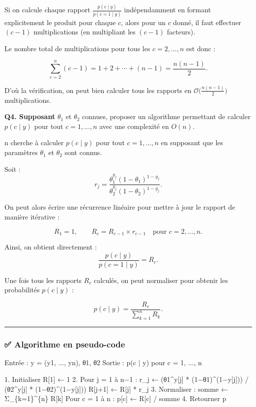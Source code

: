 \documentclass[
]{article}
\newenvironment{Shaded}{\begin{snugshade}}{\end{snugshade}}
\newcommand{\NormalTok}[1]{#1}
\begin{document}
Si on calcule chaque rapport \(\frac{p(c \mid y)}{p(c = 1 \mid y)}\)
indépendamment en formant explicitement le produit pour chaque \(c\),
alors pour un \(c\) donné, il faut effectuer \((c - 1)\) multiplications
(en multipliant les \((c - 1)\) facteurs).

Le nombre total de multiplications pour tous les \(c = 2, \ldots, n\)
est donc :

\[
\sum_{c=2}^{n} (c - 1)
= 1 + 2 + \cdots + (n - 1)
= \frac{n(n - 1)}{2}.
\]

D'où la vérification, on peut bien calculer tous les rapports en
\(\mathcal{O}\big(\tfrac{n(n - 1)}{2}\big)\) multiplications.

\textbf{Q4. Supposant} \(\theta_1\) et \(\theta_2\) connues, proposer un
algorithme permettant de calculer \(p(c \mid y)\) pour tout
\(c = 1, \ldots, n\) avec une complexité en \(O(n)\).

n cherche à calculer \(p(c \mid y)\) pour tout \(c = 1, \ldots, n\) en
supposant que les paramètres \(\theta_1\) et \(\theta_2\) sont connus.

Soit : \[
r_j = 
\frac{\theta_1^{y_j}(1 - \theta_1)^{1 - y_j}}
{\theta_2^{y_j}(1 - \theta_2)^{1 - y_j}}.
\]

On peut alors écrire une récurrence linéaire pour mettre à jour le
rapport de manière itérative :

\[
R_1 = 1, \qquad
R_c = R_{c-1} \times r_{c-1} \quad \text{pour } c = 2, \ldots, n.
\]

Ainsi, on obtient directement : \[
\frac{p(c \mid y)}{p(c = 1 \mid y)} = R_c.
\]

Une fois tous les rapports \(R_c\) calculés, on peut normaliser pour
obtenir les probabilités \(p(c \mid y)\) :

\[
p(c \mid y) = \frac{R_c}{\sum_{k=1}^{n} R_k}.
\]

\begin{center}\rule{0.5\linewidth}{0.5pt}\end{center}

\subsubsection{✅ Algorithme en
pseudo-code}\label{algorithme-en-pseudo-code}

\begin{Shaded}
\begin{Highlighting}[]
\NormalTok{Entrée : y = (y1, ..., yn), θ1, θ2}
\NormalTok{Sortie : p(c | y) pour c = 1, ..., n}

\NormalTok{1. Initialiser R[1] ← 1}
\NormalTok{2. Pour j = 1 à n−1 :}
\NormalTok{       r\_j ← (θ1\^{}y[j] * (1−θ1)\^{}(1−y[j])) / (θ2\^{}y[j] * (1−θ2)\^{}(1−y[j]))}
\NormalTok{       R[j+1] ← R[j] * r\_j}
\NormalTok{3. Normaliser :}
\NormalTok{       somme ← Σ\_\{k=1\}\^{}\{n\} R[k]}
\NormalTok{       Pour c = 1 à n :}
\NormalTok{           p[c] ← R[c] / somme}
\NormalTok{4. Retourner p}
\end{Highlighting}
\end{Shaded}
\end{document}
